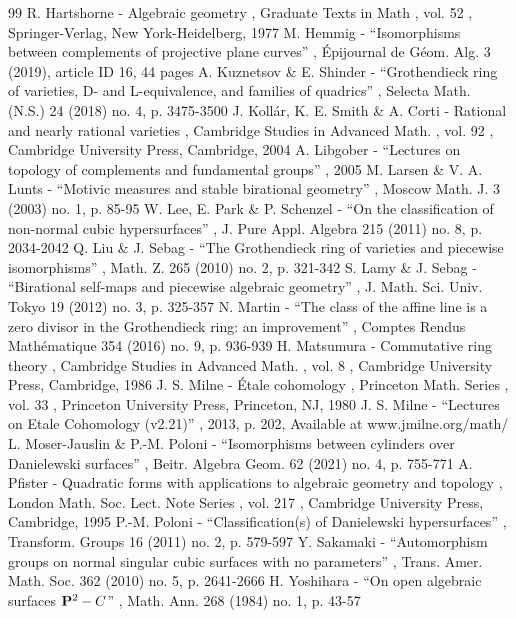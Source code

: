 \documentclass[11pt]{article}
\theoremstyle{definition}
\begin{document}
\begin{thebibliography}{99}
 R. Hartshorne - Algebraic geometry , Graduate Texts in Math , vol. 52 , Springer-Verlag, New York-Heidelberg, 1977
 M. Hemmig - “Isomorphisms between complements of projective plane curves” , Épijournal de Géom. Alg. 3 (2019), article ID 16, 44 pages
 A. Kuznetsov \& E. Shinder - “Grothendieck ring of varieties, D- and L-equivalence, and families of quadrics” , Selecta Math. (N.S.) 24 (2018) no. 4, p. 3475-3500
 J. Kollár, K. E. Smith \& A. Corti - Rational and nearly rational varieties , Cambridge Studies in Advanced Math. , vol. 92 , Cambridge University Press, Cambridge, 2004
 A. Libgober - “Lectures on topology of complements and fundamental groups” , 2005
 M. Larsen \& V. A. Lunts - “Motivic measures and stable birational geometry” , Moscow Math. J. 3 (2003) no. 1, p. 85-95
 W. Lee, E. Park \& P. Schenzel - “On the classification of non-normal cubic hypersurfaces” , J. Pure Appl. Algebra 215 (2011) no. 8, p. 2034-2042
 Q. Liu \& J. Sebag - “The Grothendieck ring of varieties and piecewise isomorphisms” , Math. Z. 265 (2010) no. 2, p. 321-342
 S. Lamy \& J. Sebag - “Birational self-maps and piecewise algebraic geometry” , J. Math. Sci. Univ. Tokyo 19 (2012) no. 3, p. 325-357
 N. Martin - “The class of the affine line is a zero divisor in the Grothendieck ring: an improvement” , Comptes Rendus Mathématique 354 (2016) no. 9, p. 936-939
 H. Matsumura - Commutative ring theory , Cambridge Studies in Advanced Math. , vol. 8 , Cambridge University Press, Cambridge, 1986
 J. S. Milne - Étale cohomology , Princeton Math. Series , vol. 33 , Princeton University Press, Princeton, NJ, 1980
 J. S. Milne - “Lectures on Etale Cohomology (v2.21)” , 2013, p. 202, Available at www.jmilne.org/math/
 L. Moser-Jauslin \& P.-M. Poloni - “Isomorphisms between cylinders over Danielewski surfaces” , Beitr. Algebra Geom. 62 (2021) no. 4, p. 755-771
 A. Pfister - Quadratic forms with applications to algebraic geometry and topology , London Math. Soc. Lect. Note Series , vol. 217 , Cambridge University Press, Cambridge, 1995
 P.-M. Poloni - “Classification(s) of Danielewski hypersurfaces” , Transform. Groups 16 (2011) no. 2, p. 579-597
 Y. Sakamaki - “Automorphism groups on normal singular cubic surfaces with no parameters” , Trans. Amer. Math. Soc. 362 (2010) no. 5, p. 2641-2666
 H. Yoshihara - “On open algebraic surfaces ${\bf P}^{2}-C$” , Math. Ann. 268 (1984) no. 1, p. 43-57
\end{thebibliography}
\end{document}
